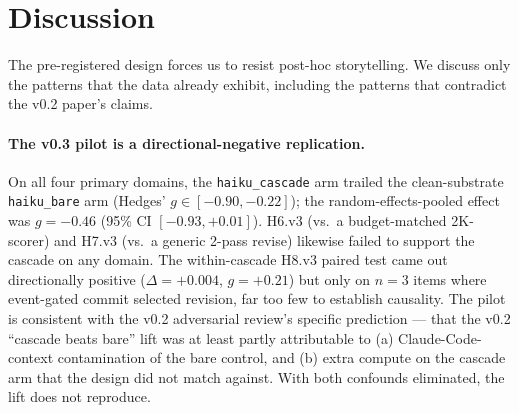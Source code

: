 \section{Discussion}\label{sec:discussion}

The pre-registered design forces us to resist post-hoc storytelling. We discuss only the patterns that the data already exhibit, including the patterns that contradict the v0.2 paper's claims.

\paragraph{The v0.3 pilot is a directional-negative replication.} On all four primary domains, the \texttt{haiku\_cascade} arm trailed the clean-substrate \texttt{haiku\_bare} arm (Hedges' $g \in [-0.90, -0.22]$); the random-effects-pooled effect was $g=-0.46$ (95\% CI $[-0.93, +0.01]$). H6.v3 (vs.\ a budget-matched 2K-scorer) and H7.v3 (vs.\ a generic 2-pass revise) likewise failed to support the cascade on any domain. The within-cascade H8.v3 paired test came out directionally positive ($\Delta=+0.004$, $g=+0.21$) but only on $n{=}3$ items where event-gated commit selected revision, far too few to establish causality. The pilot is consistent with the v0.2 adversarial review's specific prediction --- that the v0.2 ``cascade beats bare'' lift was at least partly attributable to (a) Claude-Code-context contamination of the bare control, and (b) extra compute on the cascade arm that the design did not match against. With both confounds eliminated, the lift does not reproduce.

